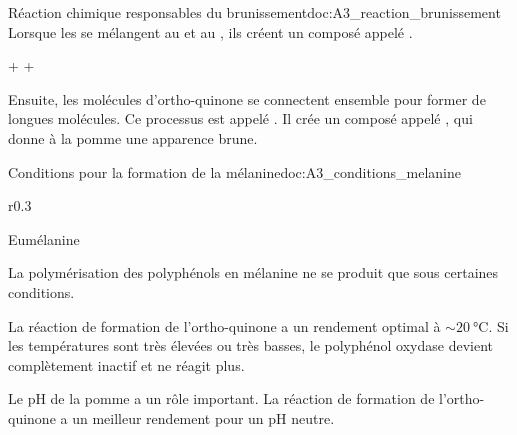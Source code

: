 


\begin{doc}{Réaction chimique responsables du brunissement}{doc:A3_reaction_brunissement}
  Lorsque les  se mélangent au  et au , ils créent un composé appelé .

  \begin{center}
     +  + 
    \reaction
  \end{center}

  Ensuite, les molécules d'ortho-quinone se connectent ensemble pour former de longues molécules.
  Ce processus est appelé .
  Il crée un composé appelé , qui donne à la pomme une apparence brune.
\end{doc}

\begin{doc}{Conditions pour la formation de la mélanine}{doc:A3_conditions_melanine}
  \begin{wrapfigure}{r}{0.3\linewidth}
    \centering
    \vspace*{-38pt}

    Eumélanine
  \end{wrapfigure}
  La polymérisation des polyphénols en mélanine ne se produit que sous certaines conditions.
  \begin{listePoints}
    \item La réaction de formation de l'ortho-quinone a un rendement optimal à $\sim\qty{20}{\degreeCelsius}$.
    Si les températures sont très élevées ou très basses, le polyphénol oxydase devient complètement inactif et ne réagit plus.
    \item Le pH de la pomme a un rôle important. La réaction de formation de l'ortho-quinone a un meilleur rendement pour un pH neutre.
  \end{listePoints}
\end{doc}


